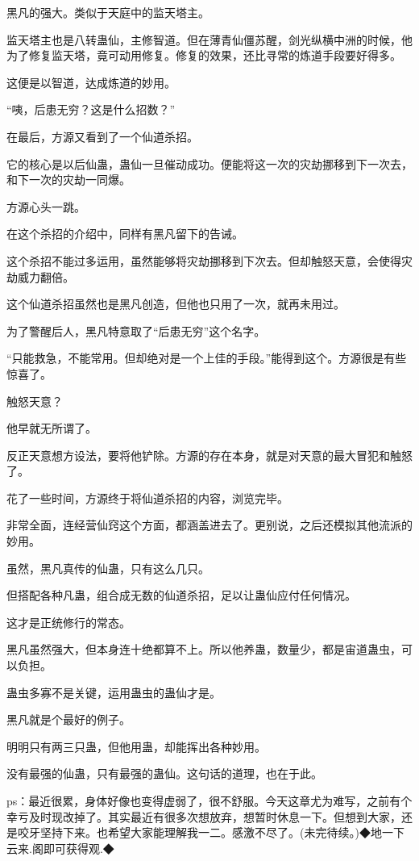 \begin{this_body}
黑凡的强大。类似于天庭中的监天塔主。

监天塔主也是八转蛊仙，主修智道。但在薄青仙僵苏醒，剑光纵横中洲的时候，他为了修复监天塔，竟可动用修复。修复的效果，还比寻常的炼道手段要好得多。

这便是以智道，达成炼道的妙用。

“咦，后患无穷？这是什么招数？”

在最后，方源又看到了一个仙道杀招。

它的核心是以后仙蛊，蛊仙一旦催动成功。便能将这一次的灾劫挪移到下一次去，和下一次的灾劫一同爆。

方源心头一跳。

在这个杀招的介绍中，同样有黑凡留下的告诫。

这个杀招不能过多运用，虽然能够将灾劫挪移到下次去。但却触怒天意，会使得灾劫威力翻倍。

这个仙道杀招虽然也是黑凡创造，但他也只用了一次，就再未用过。

为了警醒后人，黑凡特意取了“后患无穷”这个名字。

“只能救急，不能常用。但却绝对是一个上佳的手段。”能得到这个。方源很是有些惊喜了。

触怒天意？

他早就无所谓了。

反正天意想方设法，要将他铲除。方源的存在本身，就是对天意的最大冒犯和触怒了。

花了一些时间，方源终于将仙道杀招的内容，浏览完毕。

非常全面，连经营仙窍这个方面，都涵盖进去了。更别说，之后还模拟其他流派的妙用。

虽然，黑凡真传的仙蛊，只有这么几只。

但搭配各种凡蛊，组合成无数的仙道杀招，足以让蛊仙应付任何情况。

这才是正统修行的常态。

黑凡虽然强大，但本身连十绝都算不上。所以他养蛊，数量少，都是宙道蛊虫，可以负担。

蛊虫多寡不是关键，运用蛊虫的蛊仙才是。

黑凡就是个最好的例子。

明明只有两三只蛊，但他用蛊，却能挥出各种妙用。

没有最强的仙蛊，只有最强的蛊仙。这句话的道理，也在于此。

ps：最近很累，身体好像也变得虚弱了，很不舒服。今天这章尤为难写，之前有个幸亏及时现改掉了。其实最近有很多次想放弃，想暂时休息一下。但想到大家，还是咬牙坚持下来。也希望大家能理解我一二。感激不尽了。(未完待续。)◆地一下云来.阁即可获得观.◆

\end{this_body}

